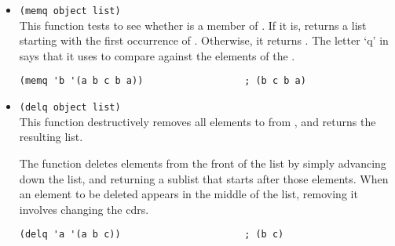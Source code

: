 \begin{itemize}
\item \lstinline|(memq object list)|\\
  This function tests to see whether  is a member of .
  If it is,  returns a list starting with the first occurrence of .
  Otherwise, it returns .
  The letter ‘q’ in  says that it uses  to compare  against the elements of the .
\begin{lstlisting}
(memq 'b '(a b c b a))                  ; (b c b a)
\end{lstlisting}
\item \lstinline|(delq object list)|\\
  This function destructively removes all elements  to  from , and returns the resulting list.

  The  function deletes elements from the front of the list by simply advancing down the list, and returning a sublist that starts after those elements.
  When an element to be deleted appears in the middle of the list, removing it involves changing the cdrs.
\begin{lstlisting}
(delq 'a '(a b c))                      ; (b c)


\end{lstlisting}
\end{itemize}

